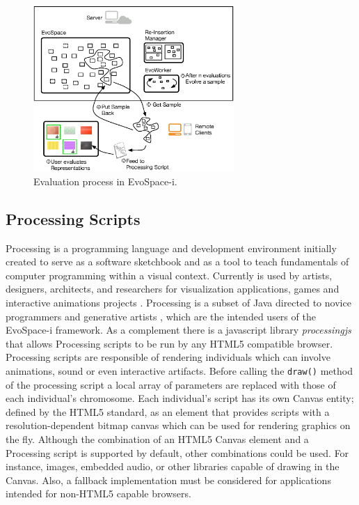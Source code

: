 \documentclass{sig-alternate}
\begin{document}
\begin{figure}[!t]
    \centering
        \includegraphics[width=3in]{evospaceInteractive.eps}
    \caption{Evaluation process in EvoSpace-i.}
    \label{fig:evoInteractive}
\end{figure}


\subsection{Processing Scripts}
Processing is a programming language and development environment initially created to serve as a software sketchbook and as a tool to teach fundamentals
of computer programming within a visual context.
Currently is used by artists, designers, architects, and researchers for visualization applications, games and interactive animations projects \cite{Reas:2007wp}.
Processing is a subset of Java directed to novice programmers and generative artists \cite{Pearson:2011ti}, which are the intended users of the EvoSpace-i framework.
As a complement there is a javascript library \emph{processingjs} that allows Processing scripts to be run by any HTML5 compatible browser.
Processing scripts are responsible of rendering individuals which can involve animations, sound or even interactive artifacts.
Before calling the \texttt{draw()} method of the processing script a local array of parameters are replaced with those of each individual's chromosome.
Each individual's script has its own Canvas entity; defined by the HTML5 standard, as an element that provides scripts with a resolution-dependent bitmap canvas which can be used for rendering graphics on the fly.
Although the combination of an HTML5 Canvas element and a Processing script is supported by default, other combinations could be used.
For instance, images, embedded audio, or other libraries capable of drawing in the Canvas.
Also, a fallback implementation must be considered for applications intended for non-HTML5 capable browsers.
\end{document}
